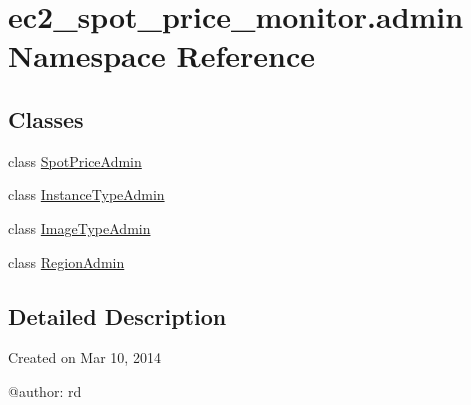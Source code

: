 \hypertarget{namespaceec2__spot__price__monitor_1_1admin}{\section{ec2\-\_\-spot\-\_\-price\-\_\-monitor.\-admin Namespace Reference}
\label{namespaceec2__spot__price__monitor_1_1admin}
}
\subsection*{Classes}
\begin{DoxyCompactItemize}
\item 
class \hyperlink{classec2__spot__price__monitor_1_1admin_1_1SpotPriceAdmin}{Spot\-Price\-Admin}
\item 
class \hyperlink{classec2__spot__price__monitor_1_1admin_1_1InstanceTypeAdmin}{Instance\-Type\-Admin}
\item 
class \hyperlink{classec2__spot__price__monitor_1_1admin_1_1ImageTypeAdmin}{Image\-Type\-Admin}
\item 
class \hyperlink{classec2__spot__price__monitor_1_1admin_1_1RegionAdmin}{Region\-Admin}
\end{DoxyCompactItemize}


\subsection{Detailed Description}
\begin{DoxyVerb}Created on Mar 10, 2014

@author: rd
\end{DoxyVerb}
 
